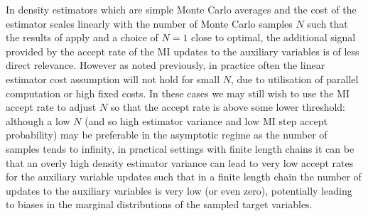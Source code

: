 In density estimators which are simple Monte Carlo averages and the cost of the estimator scales linearly with the number of Monte Carlo samples $N$ such that the results of \citep{sherlock2016pseudo} apply and a choice of $N=1$ close to optimal, the additional signal provided by the accept rate of the \ac{MI} updates to the auxiliary variables is of less direct relevance. However as noted previously, in practice often the linear estimator cost assumption will not hold for small $N$, due to utilisation of parallel computation or high fixed costs. In these cases we may still wish to use the \ac{MI} accept rate to adjust $N$ so that the accept rate is above some lower threshold: although a low $N$ (and so high estimator variance and low \ac{MI} step accept probability) may be preferable in the asymptotic regime as the number of samples tends to infinity, in practical settings with finite length chains it can be that an overly high density estimator variance can lead to very low accept rates for the auxiliary variable updates such that in a finite length chain the number of updates to the auxiliary variables is very low (or even zero), potentially leading to biases in the marginal distributions of the sampled target variables. %



